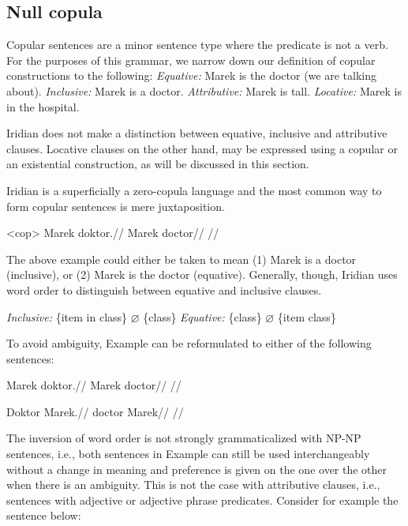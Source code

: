 \subsection{Null copula}

Copular sentences are a minor sentence type where the predicate is not a verb. For the purposes of this grammar, we narrow down our definition of copular constructions to the following:
\pex
\a \textit{Equative:} Marek is the doctor (we are talking about).
\a \textit{Inclusive:} Marek is a doctor.
\a \textit{Attributive:} Marek is tall.
\a \textit{Locative:} Marek is in the hospital.
\xe

Iridian does not make a distinction between equative, inclusive and attributive clauses. Locative clauses on the other hand, may be expressed using a copular or an existential construction, as will be discussed in this section.

Iridian is a superficially a zero-copula language and the most common way to form copular sentences is mere juxtaposition.

\pex<cop>
\begingl
\gla Marek doktor.//
\glb Marek doctor//
\glft {}//
\endgl
\xe

The above example could either be taken to mean (1) Marek is a doctor (inclusive), or (2) Marek is the doctor (equative). Generally, though, Iridian uses word order to distinguish between equative and inclusive clauses.

\pex
\a \textit{Inclusive:} \{item in class\} $\varnothing$ \{class\}
\a \textit{Equative:} \{class\} $\varnothing$ \{item class\}
\xe

To avoid ambiguity, Example  can be reformulated to either of the following sentences:

\a 
\begingl
\gla Marek doktor.//
\glb Marek doctor//
\glft {}//
\endgl

\a 
\begingl
\gla Doktor Marek.//
\glb doctor Marek//
\glft {}//
\endgl

\xe

The inversion of word order is not strongly grammaticalized with NP-NP sentences, i.e., both sentences in Example  can still be used interchangeably without a change in meaning and preference is given on the one over the other when there is an ambiguity. This is not the case with attributive clauses, i.e., sentences with adjective or adjective phrase predicates. Consider for example the sentence below:

